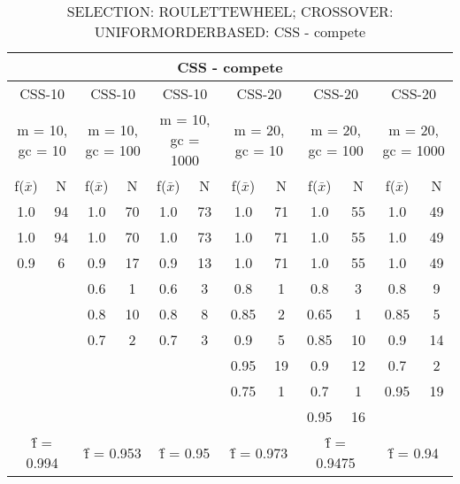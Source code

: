 \begin{table}[H]
	\centering
	\caption{SELECTION: ROULETTEWHEEL; CROSSOVER: UNIFORMORDERBASED: CSS - compete}
	\begin{adjustbox}{width=1\textwidth}
		\begin{tabular}{ |c|c||c|c||c|c||c|c||c|c||c|c| }
			\hline
			\multicolumn{12}{|c|}{CSS - compete} \\
			\hline
			\multicolumn{2}{|c||}{CSS-10} & \multicolumn{2}{c||}{CSS-10} & \multicolumn{2}{c||}{CSS-10} & \multicolumn{2}{c||}{CSS-20} & \multicolumn{2}{c||}{CSS-20} & \multicolumn{2}{c|}{CSS-20}\\
			\hline
			\multicolumn{2}{|c||}{m = 10, gc = 10} & \multicolumn{2}{c||}{m = 10, gc = 100} & \multicolumn{2}{c||}{m = 10, gc = 1000} & \multicolumn{2}{c||}{m = 20, gc = 10} & \multicolumn{2}{c||}{m = 20, gc = 100} & \multicolumn{2}{c|}{m = 20, gc = 1000}\\
			\hline
			f($\bar{x}$) & N & f($\bar{x}$) & N & f($\bar{x}$) & N & f($\bar{x}$) & N & f($\bar{x}$) & N & f($\bar{x}$) & N\\
			\hline
			\hline
			1.0 & 94 & 1.0 & 70 & 1.0 & 73 & 1.0 & 71 & 1.0 & 55 & 1.0 & 49\\
			\hline
			1.0 & 94 & 1.0 & 70 & 1.0 & 73 & 1.0 & 71 & 1.0 & 55 & 1.0 & 49\\
			0.9 & 6 & 0.9 & 17 & 0.9 & 13 & 1.0 & 71 & 1.0 & 55 & 1.0 & 49\\
			&   & 0.6 & 1 & 0.6 & 3 & 0.8 & 1 & 0.8 & 3 & 0.8 & 9\\
			&   & 0.8 & 10 & 0.8 & 8 & 0.85 & 2 & 0.65 & 1 & 0.85 & 5\\
			&   & 0.7 & 2 & 0.7 & 3 & 0.9 & 5 & 0.85 & 10 & 0.9 & 14\\
			&   &   &   &   &   & 0.95 & 19 & 0.9 & 12 & 0.7 & 2\\
			&   &   &   &   &   & 0.75 & 1 & 0.7 & 1 & 0.95 & 19\\
			&   &   &   &   &   &   &   & 0.95 & 16 &   &  \\
			\hline
			\multicolumn{2}{|c||}{\^{f} = 0.994} & \multicolumn{2}{c||}{\^{f} = 0.953} & \multicolumn{2}{c||}{\^{f} = 0.95} & \multicolumn{2}{c||}{\^{f} = 0.973} & \multicolumn{2}{c||}{\^{f} = 0.9475} & \multicolumn{2}{c|}{\^{f} = 0.94}\\
			\hline
		\end{tabular}
	\end{adjustbox}
\end{table}

